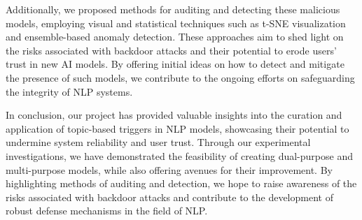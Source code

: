Additionally, we proposed methods for auditing and detecting these malicious models, employing visual and statistical techniques such as t-SNE visualization and ensemble-based anomaly detection. These approaches aim to shed light on the risks associated with backdoor attacks and their potential to erode users' trust in new AI models. By offering initial ideas on how to detect and mitigate the presence of such models, we contribute to the ongoing efforts on safeguarding the integrity of NLP systems.

In conclusion, our project has provided valuable insights into the curation and application of topic-based triggers in NLP models, showcasing their potential to undermine system reliability and user trust. Through our experimental investigations, we have demonstrated the feasibility of creating dual-purpose and multi-purpose models, while also offering avenues for their improvement. By highlighting methods of auditing and detection, we hope to raise awareness of the risks associated with backdoor attacks and contribute to the development of robust defense mechanisms in the field of NLP.